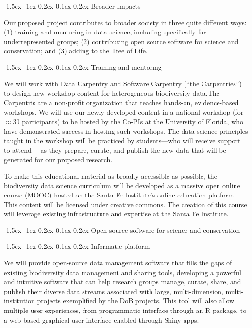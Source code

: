 \documentclass[11pt]{article}
\makeatletter
\renewcommand\section{\@startsection{section}{1}{\z@}%
                                  {-1.5ex \@plus -1ex \@minus 0.2ex}%
                                  {0.1ex \@plus 0.2ex}%
                                  {\normalfont\Large\bfseries}}
\renewcommand\subsection{\@startsection{subsection}{1}{\z@}%
                                  {-1.5ex \@plus -1ex \@minus 0.2ex}%
                                  {0.1ex \@plus 0.2ex}%
                                  {\normalfont\large\bfseries}}
\renewcommand\subsubsection{\@startsection{subsection}{1}{\z@}%
                                  {-1.5ex \@plus -1ex \@minus 0.2ex}%
                                  {0.1ex \@plus 0.2ex}%
                                  {\normalfont\bfseries}}
\makeatother
\begin{document}
\section{Broader Impacts}\label{broader-impacts}

Our proposed project contributes to broader society in three quite
different ways: (1) training and mentoring in data science, including
specifically for underrepresented groups; (2) contributing open source
software for science and conservation; and (3) adding to the Tree of
Life.

\subsection{Training and mentoring}\label{training-and-mentoring}

We will work with Data Carpentry and Software Carpentry (``the
Carpentries'') to design new workshop content for heterogeneous
biodiversity data.The Carpentris are a non-profit organization that
teaches hands-on, evidence-based workshops. We will use our newly
developed content in a national workshop (for $\approx 30$
participants) to be hosted by the Co-PIs at the University of Florida,
who have demonstrated success in hosting such workshops. The data
science principles taught in the workshop will be practiced by
students---who will receive support to attend--- as they prepare,
curate, and publish the new data that will be generated for our
proposed research.

To make this educational material as broadly accessible as possible,
the biodiversity data science curriculum will be developed as a
massive open online course (MOOC) hosted on the Santa Fe Institute's
online education platform. This content will be licensed under
creative commons. The creation of this course will leverage existing
infrastructure and expertise at the Santa Fe Institute.

\subsection{Open source software for science and conservation}\label{open-source-software}

\subsubsection{Informatic platform}\label{informatic-platform}

We will provide open-source data management software that fills the
gaps of existing biodiversity data management and sharing tools,
developing a powerful and intuitive software that can help research
groups manage, curate, share, and publish their diverse data streams
associated with large, multi-dimension, multi-institution projects
exemplified by the DoB projects. This tool will also allow multiple
user experiences, from programmatic interface through an R package, to
a web-based graphical user interface enabled through Shiny apps.
\end{document}
